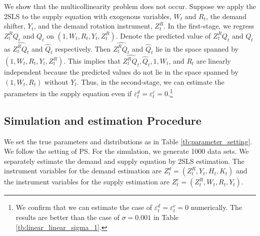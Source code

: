 \documentclass[11pt, a4paper]{article}
\begin{document}

We show that the multicollinearity problem does not occur. 
Suppose we apply the 2SLS to the supply equation with exogenous variables, $W_{t}$ and $R_{t}$, the demand shifter, $Y_{t}$, and the demand rotation instrument, $Z^{R}_{t}$.
In the first-stage, we regress $Z^{R}_{t}Q_{t}$ and $Q_{t}$ on $(1, W_{t}, R_{t}, Y_{t}, Z^{R}_{t})$.
Denote the predicted value of $Z^{R}_{t}Q_{t}$ and $Q_{t}$ as $\widehat{Z^{R}_{t}Q_{t}}$ and $\widehat{Q}_{t}$ respectively.
Then $\widehat{Z^{R}_{t}Q_{t}}$ and $\widehat{Q}_{t}$ lie in the space spanned by $(1, W_{t}, R_{t}, Y_{t}, Z^{R}_{t})$.
This implies that $\widehat{Z^{R}_{t}Q_{t}}, \widehat{Q}_{t}, 1, W_{t}$, and $R_{t}$ are linearly independent because the predicted values do not lie in the space spanned by $(1, W_{t}, R_{t})$ without $Y_{t}$.
Thus, in the second-stage, we can estimate the parameters in the supply equation even if $\varepsilon_{t}^{d} = \varepsilon_{t}^{c} = 0$.\footnote{We confirm that we can estimate the case of $\varepsilon_{t}^{d} = \varepsilon_{t}^{c} = 0$ numerically. The results are better than the case of $\sigma=0.001$ in Table \ref{tb:linear_linear_sigma_1}.}

\subsection{Simulation and estimation Procedure}

We set the true parameters and distributions as in Table \ref{tb:parameter_setting}. 
We follow the setting of PS. For the simulation, we generate 1000 data sets.
We separately estimate the demand and supply equation by 2SLS estimation.
The instrument variables for the demand estimation are $Z^{d}_{t} = (Z^{R}_{t}, Y_t, H_{t}, K_{t})$ and the instrument variables for the supply estimation are $Z^{c}_{t} = (Z^{R}_{t}, W_{t}, R_{t}, Y_t)$. 
\end{document}
